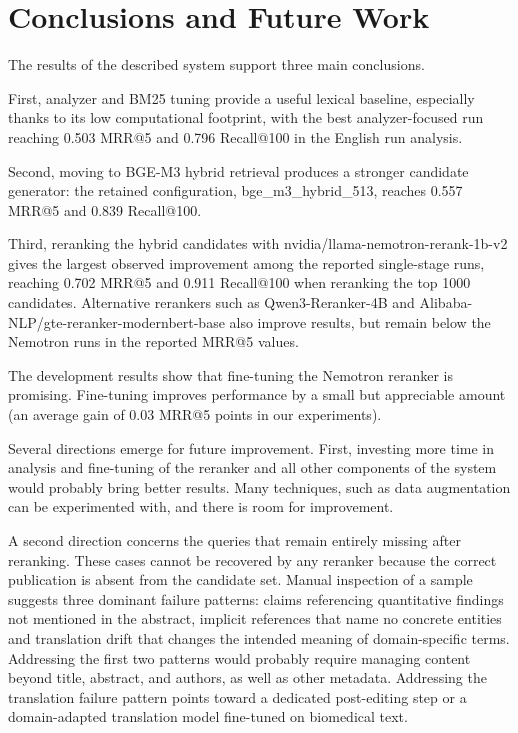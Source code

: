 \section{Conclusions and Future Work}
\label{sec:conclusion}

The results of the described system support three main conclusions.

First, analyzer and BM25 tuning provide a useful lexical baseline, especially thanks to its low computational footprint, with the best analyzer-focused run reaching 0.503 MRR@5 and 0.796 Recall@100 in the English run analysis.

Second, moving to BGE-M3 hybrid retrieval produces a stronger candidate generator: the retained configuration, bge\_m3\_hybrid\_513, reaches 0.557 MRR@5 and 0.839 Recall@100.

Third, reranking the hybrid candidates with nvidia/llama-nemotron-rerank-1b-v2 gives the largest observed improvement among the reported single-stage runs, reaching 0.702 MRR@5 and 0.911 Recall@100 when reranking the top 1000 candidates. Alternative rerankers such as Qwen3-Reranker-4B and Alibaba-NLP/gte-reranker-modernbert-base also improve results, but remain below the Nemotron runs in the reported MRR@5 values.

The development results show that fine-tuning the Nemotron reranker is promising. Fine-tuning improves performance by a small but appreciable amount (an average gain of 0.03 MRR@5 points in our experiments).

Several directions emerge for future improvement. 
First, investing more time in analysis and fine-tuning of the reranker and all other components of the system would probably bring better results. Many techniques, such as data augmentation can be experimented with, and there is room for improvement.

A second direction concerns the queries that remain entirely missing after reranking. These cases cannot be recovered by any reranker because the correct publication is absent from the candidate set. Manual inspection of a sample suggests three dominant failure patterns: claims referencing quantitative findings not mentioned in the abstract, implicit references that name no concrete entities and translation drift that changes the intended meaning of domain-specific terms. Addressing the first two patterns would probably require managing content beyond title, abstract, and authors, as well as other metadata. Addressing the translation failure pattern points toward a dedicated post-editing step or a domain-adapted translation model fine-tuned on biomedical text.

